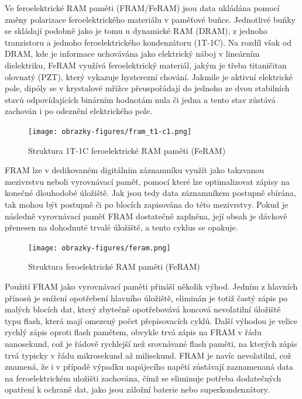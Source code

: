 Ve feroelektrické RAM paměti (FRAM/FeRAM) jsou data ukládána pomocí změny polarizace feroelektrického materiálu v paměťové buňce. Jednotlivé buňky se skládají podobně jako je tomu u dynamické RAM (DRAM), z jednoho tranzistoru a jednoho feroelektrického kondenzátoru (1T-1C). Na rozdíl však od DRAM, kde je informace uchovávána jako elektrický náboj v lineárním dielektriku, FeRAM využívá feroelektrický materiál, jakým je třeba titaničitan olovnatý (PZT), který vykazuje hysterezní chování. Jakmile je aktivní elektrické pole, dipóly se v krystalové mřížce přeuspořádají do jednoho ze dvou stabilních stavů odpovídajících binárním hodnotám nula či jedna a tento stav zůstává zachován i po odeznění elektrického pole. \cite{ieee_feram_ultra_high_density_embedded_mem}

\begin{figure}[h]
    \centering
    \texttt{[image: obrazky-figures/fram\_t1-c1.png]}
    
    \caption{Struktura 1T-1C feroelektrické RAM paměti (FeRAM) \cite{researchgate_nonvolatile_memory_technologies}}
    \label{fig:feram-1t-1c}
\end{figure}

FRAM lze v dedikovaném digitálním záznamníku využít jako takzvanou mezivrstvu neboli vyrovnávací paměť, pomocí které lze optimalizovat zápisy na konečné dlouhodobé úložiště. Jak jsou tedy data záznamníkem postupně sbírána, tak mohou být postupně či po blocích zapisována do této mezivrstvy. Pokud je následně vyrovnávací paměť FRAM dostatečně zaplněna, její obsah je dávkově přenesen na dohodnuté trvalé úložiště, a tento cyklus se opakuje. 

\begin{figure}[h]
    \centering
    \texttt{[image: obrazky-figures/feram.png]}
    
    \caption{Struktura feroelektrické RAM paměti (FeRAM) \cite{researchgate_nonvolatile_memory_technologies}}
    \label{fig:feram-structure}
\end{figure}

Použití FRAM jako vyrovnávací paměti přináší několik výhod. Jedním z hlavních přínosů je snížení opotřebení hlavního úložiště, eliminán je totiž častý zápis po malých blocích dat, který zbytečně opotřebovává koncová nevolatilní úložiště typu flash, která mají omezený počet přepisovacích cyklů. Další výhodou je velice rychlý zápis oproti flash pamětem, obvykle trvá zápis na FRAM v řádu nanosekund, což je řádově rychlejší než srovnávané flash paměti, na kterých zápis trvá typicky v řádu mikrosekund až milisekund. FRAM je navíc nevolatilní, což znamená, že i v případě výpadku napájecího napětí zůstávají zaznamenaná data na feroelektrickém uložišti zachována, čímž se eliminuje potřeba dodatečných opatření k ochraně dat, jako jsou záložní baterie nebo superkondenzátory.

